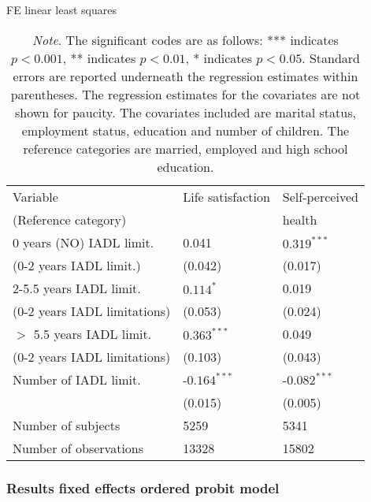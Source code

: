 \documentclass[12pt]{article}
\begin{document}
\begin{table}[htbp]
\centering
\footnotesize
\caption{FE linear least squares}
\label{OLS}
\begin{tabular}{l ll}
\hline
Variable & Life satisfaction & Self-perceived \\
(Reference category)&        &  health\\\hline\hline
0 years (NO) IADL limit.                &  0.041         &  $0.319^{***}$   \\
(0-2 years IADL limit.)                 &  (0.042)       &  (0.017)         \\
\rule{0pt}{3ex}2-5.5 years IADL limit.  &  $0.114^{*}$   &  0.019           \\
(0-2 years IADL limitations)            &  (0.053)       &  (0.024)         \\
\rule{0pt}{3ex}$>$ 5.5 years IADL limit.&  $0.363^{***}$ &  0.049           \\
(0-2 years IADL limitations)            &  (0.103)       &  (0.043)         \\
\rule{0pt}{3ex}Number of IADL limit.    & -$0.164^{***}$ & -$0.082^{***}$   \\
                                        &  (0.015)       &  (0.005)         \\
\rule{0pt}{3ex}Number of subjects       & 5259           & 5341             \\
Number of observations                  & 13328          & 15802            \\
\hline
\end{tabular}
\caption*{\footnotesize{\textit{Note}. The significant codes are as follows: *** indicates $p < 0.001$, ** indicates $p < 0.01$, * indicates $p <0.05$. Standard errors are reported underneath the regression estimates within parentheses. The regression estimates for the covariates are not shown for paucity. The covariates included are marital status, employment status, education and number of children. The reference categories are married, employed and high school education.}}
\end{table}

\FloatBarrier


\subsubsection{Results fixed effects ordered probit model}
\end{document}
